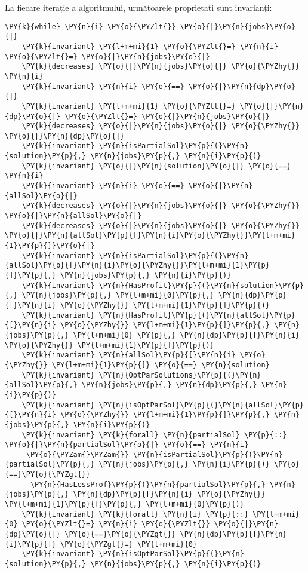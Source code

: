 La fiecare iterație a algoritmului, următoarele proprietati sunt invarianți:
\begin{Verbatim}[commandchars=\\\{\},fontsize=\small]
\PY{k}{while} \PY{n}{i} \PY{o}{\PYZlt{}} \PY{o}{|}\PY{n}{jobs}\PY{o}{|}
    \PY{k}{invariant} \PY{l+m+mi}{1} \PY{o}{\PYZlt{}=} \PY{n}{i} \PY{o}{\PYZlt{}=} \PY{o}{|}\PY{n}{jobs}\PY{o}{|}
    \PY{k}{decreases} \PY{o}{|}\PY{n}{jobs}\PY{o}{|} \PY{o}{\PYZhy{}} \PY{n}{i}
    \PY{k}{invariant} \PY{n}{i} \PY{o}{==} \PY{o}{|}\PY{n}{dp}\PY{o}{|}
    \PY{k}{invariant} \PY{l+m+mi}{1} \PY{o}{\PYZlt{}=} \PY{o}{|}\PY{n}{dp}\PY{o}{|} \PY{o}{\PYZlt{}=} \PY{o}{|}\PY{n}{jobs}\PY{o}{|}
    \PY{k}{decreases} \PY{o}{|}\PY{n}{jobs}\PY{o}{|} \PY{o}{\PYZhy{}} \PY{o}{|}\PY{n}{dp}\PY{o}{|}
    \PY{k}{invariant} \PY{n}{isPartialSol}\PY{p}{(}\PY{n}{solution}\PY{p}{,} \PY{n}{jobs}\PY{p}{,} \PY{n}{i}\PY{p}{)}
    \PY{k}{invariant} \PY{o}{|}\PY{n}{solution}\PY{o}{|} \PY{o}{==} \PY{n}{i}
    \PY{k}{invariant} \PY{n}{i} \PY{o}{==} \PY{o}{|}\PY{n}{allSol}\PY{o}{|}
    \PY{k}{decreases} \PY{o}{|}\PY{n}{jobs}\PY{o}{|} \PY{o}{\PYZhy{}} \PY{o}{|}\PY{n}{allSol}\PY{o}{|}
    \PY{k}{decreases} \PY{o}{|}\PY{n}{jobs}\PY{o}{|} \PY{o}{\PYZhy{}} \PY{o}{|}\PY{n}{allSol}\PY{p}{[}\PY{n}{i}\PY{o}{\PYZhy{}}\PY{l+m+mi}{1}\PY{p}{]}\PY{o}{|}
    \PY{k}{invariant} \PY{n}{isPartialSol}\PY{p}{(}\PY{n}{allSol}\PY{p}{[}\PY{n}{i}\PY{o}{\PYZhy{}}\PY{l+m+mi}{1}\PY{p}{]}\PY{p}{,} \PY{n}{jobs}\PY{p}{,} \PY{n}{i}\PY{p}{)}
    \PY{k}{invariant} \PY{n}{HasProfit}\PY{p}{(}\PY{n}{solution}\PY{p}{,} \PY{n}{jobs}\PY{p}{,} \PY{l+m+mi}{0}\PY{p}{,} \PY{n}{dp}\PY{p}{[}\PY{n}{i} \PY{o}{\PYZhy{}} \PY{l+m+mi}{1}\PY{p}{]}\PY{p}{)}
    \PY{k}{invariant} \PY{n}{HasProfit}\PY{p}{(}\PY{n}{allSol}\PY{p}{[}\PY{n}{i} \PY{o}{\PYZhy{}} \PY{l+m+mi}{1}\PY{p}{]}\PY{p}{,} \PY{n}{jobs}\PY{p}{,} \PY{l+m+mi}{0} \PY{p}{,} \PY{n}{dp}\PY{p}{[}\PY{n}{i} \PY{o}{\PYZhy{}} \PY{l+m+mi}{1}\PY{p}{]}\PY{p}{)}
    \PY{k}{invariant} \PY{n}{allSol}\PY{p}{[}\PY{n}{i} \PY{o}{\PYZhy{}} \PY{l+m+mi}{1}\PY{p}{]} \PY{o}{==} \PY{n}{solution}
    \PY{k}{invariant} \PY{n}{OptParSolutions}\PY{p}{(}\PY{n}{allSol}\PY{p}{,} \PY{n}{jobs}\PY{p}{,} \PY{n}{dp}\PY{p}{,} \PY{n}{i}\PY{p}{)}
    \PY{k}{invariant} \PY{n}{isOptParSol}\PY{p}{(}\PY{n}{allSol}\PY{p}{[}\PY{n}{i} \PY{o}{\PYZhy{}} \PY{l+m+mi}{1}\PY{p}{]}\PY{p}{,} \PY{n}{jobs}\PY{p}{,} \PY{n}{i}\PY{p}{)}
    \PY{k}{invariant} \PY{k}{forall} \PY{n}{partialSol} \PY{p}{::} \PY{o}{|}\PY{n}{partialSol}\PY{o}{|} \PY{o}{==} \PY{n}{i} 
     \PY{o}{\PYZam{}\PYZam{}} \PY{n}{isPartialSol}\PY{p}{(}\PY{n}{partialSol}\PY{p}{,} \PY{n}{jobs}\PY{p}{,} \PY{n}{i}\PY{p}{)} \PY{o}{==}\PY{o}{\PYZgt{}}
      \PY{n}{HasLessProf}\PY{p}{(}\PY{n}{partialSol}\PY{p}{,} \PY{n}{jobs}\PY{p}{,} \PY{n}{dp}\PY{p}{[}\PY{n}{i} \PY{o}{\PYZhy{}} \PY{l+m+mi}{1}\PY{p}{]}\PY{p}{,} \PY{l+m+mi}{0}\PY{p}{)}
    \PY{k}{invariant} \PY{k}{forall} \PY{n}{i} \PY{p}{::} \PY{l+m+mi}{0} \PY{o}{\PYZlt{}=} \PY{n}{i} \PY{o}{\PYZlt{}} \PY{o}{|}\PY{n}{dp}\PY{o}{|} \PY{o}{==}\PY{o}{\PYZgt{}} \PY{n}{dp}\PY{p}{[}\PY{n}{i}\PY{p}{]} \PY{o}{\PYZgt{}=} \PY{l+m+mi}{0}
    \PY{k}{invariant} \PY{n}{isOptParSol}\PY{p}{(}\PY{n}{solution}\PY{p}{,} \PY{n}{jobs}\PY{p}{,} \PY{n}{i}\PY{p}{)}
\end{Verbatim}

